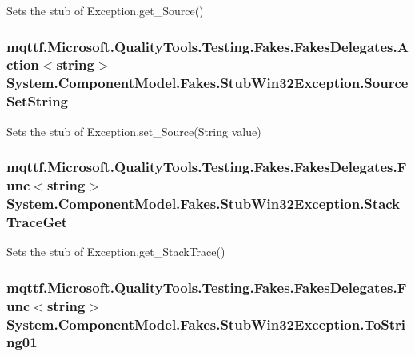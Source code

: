 Sets the stub of Exception.\-get\-\_\-\-Source()

\hypertarget{class_system_1_1_component_model_1_1_fakes_1_1_stub_win32_exception_a52cef6efb91feef7091819b8aa735b9c}{
\subsubsection[{Source\-Set\-String}]{\setlength{\rightskip}{0pt plus 5cm}mqttf.\-Microsoft.\-Quality\-Tools.\-Testing.\-Fakes.\-Fakes\-Delegates.\-Action$<$string$>$ System.\-Component\-Model.\-Fakes.\-Stub\-Win32\-Exception.\-Source\-Set\-String}}\label{class_system_1_1_component_model_1_1_fakes_1_1_stub_win32_exception_a52cef6efb91feef7091819b8aa735b9c}


Sets the stub of Exception.\-set\-\_\-\-Source(\-String value)

\hypertarget{class_system_1_1_component_model_1_1_fakes_1_1_stub_win32_exception_aafe1dc35695ff88fc5cba3e96a24d2e7}{
\subsubsection[{Stack\-Trace\-Get}]{\setlength{\rightskip}{0pt plus 5cm}mqttf.\-Microsoft.\-Quality\-Tools.\-Testing.\-Fakes.\-Fakes\-Delegates.\-Func$<$string$>$ System.\-Component\-Model.\-Fakes.\-Stub\-Win32\-Exception.\-Stack\-Trace\-Get}}\label{class_system_1_1_component_model_1_1_fakes_1_1_stub_win32_exception_aafe1dc35695ff88fc5cba3e96a24d2e7}


Sets the stub of Exception.\-get\-\_\-\-Stack\-Trace()

\hypertarget{class_system_1_1_component_model_1_1_fakes_1_1_stub_win32_exception_afbe4df9f9f8b396fa8022ae0e9b2671a}{
\subsubsection[{To\-String01}]{\setlength{\rightskip}{0pt plus 5cm}mqttf.\-Microsoft.\-Quality\-Tools.\-Testing.\-Fakes.\-Fakes\-Delegates.\-Func$<$string$>$ System.\-Component\-Model.\-Fakes.\-Stub\-Win32\-Exception.\-To\-String01}}\label{class_system_1_1_component_model_1_1_fakes_1_1_stub_win32_exception_afbe4df9f9f8b396fa8022ae0e9b2671a}


